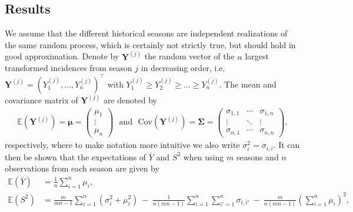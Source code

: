 \documentclass{article}
\newcommand{\sd}{s}
\newcommand{\mean}{\bar{Y}}
\begin{document}
\subsection{Results}

We assume that the different historical seasons are independent realizations of the same random process, which is certainly not strictly true, but should hold in good approximation. Denote by $\mathbf{Y}^{(j)}$ the random vector of the $n$ largest transformed incidences from season $j$ in decreasing order, i.e. $\mathbf{Y}^{(j)} = (Y^{(j)}_1, \dots, Y^{(j)}_n)^\top$ with $Y^{(j)}_1 \geq Y^{(j)}_2 \geq \dots \geq Y^{(j)}_n$. The mean and covariance matrix of $\mathbf{Y}^{(j)}$ are denoted by
\begin{align}
\mathbb{E}\left(\mathbf{Y}^{(j)}\right) = \boldsymbol{\mu} = \left(\begin{array}{c}
\mu_1\\
\vdots\\
\mu_n
\end{array}\right) \ \ \ \text{and} \ \ \ \text{Cov}\left(\mathbf{Y}^{(j)}\right) = \boldsymbol{\Sigma} =
\left(\begin{array}{ccc}
\sigma_{1, 1} & \cdots & \sigma_{1, n}\\
\vdots & \ddots &\vdots\\
\sigma_{n, 1} & \cdots & \sigma_{n, n}
\end{array}\right),
\end{align}
respectively, where to make notation more intuitive we also write $\sigma^2_i = \sigma_{i, i}$. It can then be shown that the expectations of $\mean$ and $S^2$ when using $m$ seasons and $n$ observations from each season are given by
\begin{align}
\mathbb{E}(\mean) & = \frac{1}{n} \sum_{i = 1}^n \mu_i,
\label{eq:expectation_mu}\\
\mathbb{E}(S^2) & = \frac{m}{mn - 1} \sum_{i = 1}^n (\sigma_{i}^2 + \mu_i^2) \ - \ \frac{1}{n(mn - 1)} \sum_{i = 1}^n \sum_{i' = 1}^n \sigma_{i,i'} \ - \ \frac{m}{n(mn - 1)}\left(\sum_{i = 1}^n \mu_i\right)^2,
\label{eq:expectation_sigma2}
\end{align}
\end{document}
